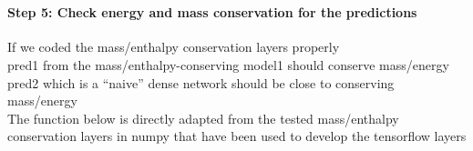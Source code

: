 \documentclass[11pt]{article}
\begin{document}
    \begin{center}
    \end{center}
    { \hspace*{\fill} \\}
    
    \hypertarget{step-5-check-energy-and-mass-conservation-for-the-predictions}{%
\paragraph{Step 5: Check energy and mass conservation for the
predictions}\label{step-5-check-energy-and-mass-conservation-for-the-predictions}}

If we coded the mass/enthalpy conservation layers properly\\
pred1 from the mass/enthalpy-conserving model1 should conserve
mass/energy\\
pred2 which is a ``naive'' dense network should be close to conserving
mass/energy\\
The function below is directly adapted from the tested mass/enthalpy
conservation layers in numpy that have been used to develop the
tensorflow layers
\end{document}
